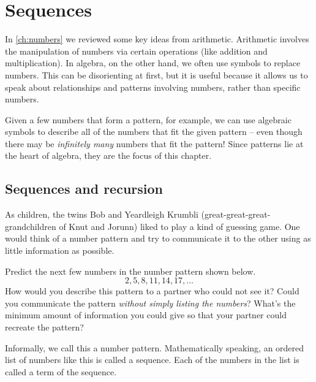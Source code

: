 \chapter{Sequences}
\label{ch:sequences}


In \cref{ch:numbers} we reviewed some key ideas from arithmetic. Arithmetic involves the manipulation of numbers via certain operations (like addition and multiplication). In algebra, on the other hand, we often use symbols to replace numbers. This can be disorienting at first, but it is useful because it allows us to speak about relationships and patterns involving numbers, rather than specific numbers.

Given a few numbers that form a pattern, for example, we can use algebraic symbols to describe all of the numbers that fit the given pattern -- even though there may be \textit{infinitely many} numbers that fit the pattern! Since patterns lie at the heart of algebra, they are the focus of this chapter.

\newif\iffractals
\fractalstrue

\section{Sequences and recursion}
\label{sec:recursion}

\begin{boxexplore}
As children, the twins Bob and Yeardleigh Krumbli (great-great-great-grandchildren of Knut and Jorunn) liked to play a kind of guessing game. One would think of a number pattern and try to communicate it to the other using as little information as possible.

Predict the next few numbers in the number pattern shown below.
\[2, 5, 8, 11, 14, 17, \dotsc\]
How would you describe this pattern to a partner who could not see it? Could you communicate the pattern \textit{without simply listing the numbers}? What's the minimum amount of information you could give so that your partner could recreate the pattern?
\end{boxexplore}

Informally, we call this a number pattern. Mathematically speaking, an ordered list of numbers like this is called a \gls{sequence}. Each of the numbers in the list is called a \gls{term} of the sequence.

